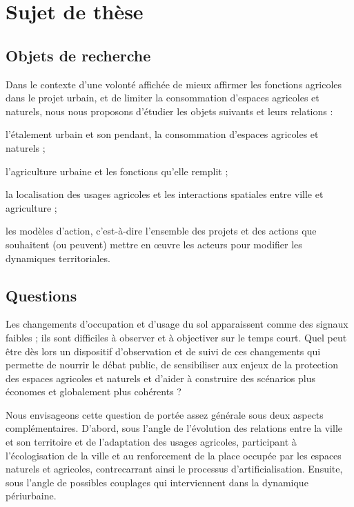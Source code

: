 \page[yes]
\section[sujet]{Sujet de thèse}

\subsection{Objets de recherche}

Dans le contexte d'une volonté affichée de mieux affirmer les fonctions agricoles
dans le projet urbain,
et de limiter la consommation d'espaces agricoles et naturels,
nous nous proposons d'étudier les objets suivants et leurs relations :

\startitemize[packed]

\item l'étalement urbain et son pendant, la consommation d'espaces agricoles et naturels ;
\item l'agriculture urbaine et les fonctions qu'elle remplit ;
\item la localisation des usages agricoles
  et les interactions spatiales entre ville et agriculture ;
\item les modèles d'action, c'est-à-dire l'ensemble
  des projets et des actions que souhaitent (ou peuvent) mettre en œuvre
  les acteurs pour modifier les dynamiques territoriales.

\stopitemize

\subsection{Questions}

Les changements d'occupation et d'usage du sol apparaissent comme des signaux faibles ;
ils sont difficiles à observer et à objectiver sur le temps court.
Quel peut être dès lors un dispositif d'observation et de suivi de ces changements
qui permette de nourrir le débat public, de sensibiliser aux enjeux de la protection
des espaces agricoles et naturels et d'aider à construire des scénarios
plus économes et globalement plus cohérents ?

Nous envisageons cette question de portée assez générale
sous deux aspects complémentaires. D'abord, sous l'angle de 
l'évolution des relations entre la ville et son territoire et de l'adaptation
des usages agricoles, participant à l'écologisation de la ville et
au renforcement de la place occupée par les espaces naturels et agricoles,
contrecarrant ainsi le processus d'artificialisation.
Ensuite, sous l'angle de possibles couplages
qui interviennent dans la dynamique périurbaine.

